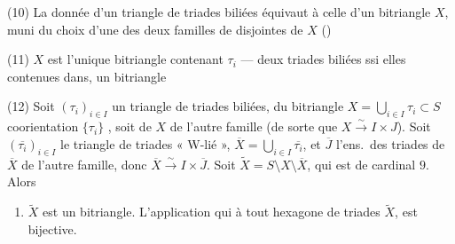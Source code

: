 \documentclass[11pt,a4paper]{article}
\begin{document}
(10) La donnée d'un triangle de triades biliées 
équivaut à celle d'un bitriangle $X$, muni
\struck{\ill{}} du choix d'une \struck{\ill{}} des deux familles  de
  disjointes de $X$ ()


(11) $X$ est l'unique bitriangle contenant $\tau_i$ --- deux triades
 biliées ssi elles   contenues dans, un \ill{}
bitriangle \struck{\ill{}}

(12) Soit \struck{\ill{}} $(\tau_i)_{i\in I}$ un triangle de triades biliées,
 du bitriangle $X = \bigcup_{i\in I} \tau_i \subset S$ \ill{} \ill{}
coorientation $\{\tau_i\}$ \struck{\ill{}}, soit  
 de $X$ de l'autre famille (de sorte que $X \xrightarrow{\sim} I \times J$).
Soit $(\overline{\tau_i})_{i\in I}$ le triangle de triades « W-lié », $\overline{X} = \bigcup_{i\in I}\overline{\tau_i}$,
et $\overline{J}$ l'ens.\ des triades de $\overline{X}$ de l'autre famille,
donc $\overline{X} \xrightarrow{\sim} I \times \overline{J}$. Soit $\widetilde{X} = S \setminus X \setminus \overline{X}$, qui
est de cardinal $9$.  Alors
\begin{enumerate}
\item[a)] $\widetilde{X}$ est un  bitriangle.  L'application qui à tout
hexagone de triades  $\widetilde{X}$, est bijective. \struck{\ill{}}
\end{enumerate}
\end{document}

